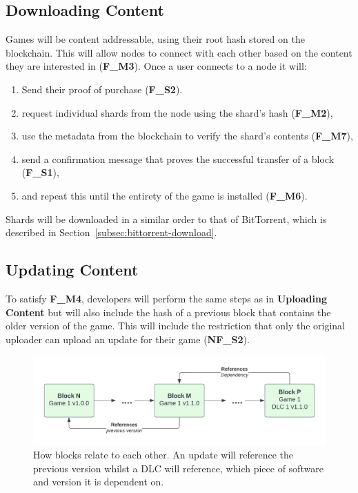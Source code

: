 \subsection*{Downloading Content}

Games will be content addressable, using their root hash stored on the blockchain. This will allow nodes to connect with each other based on the content they are interested in (\textbf{F\_M3}). Once a user connects to a node it will:

\begin{enumerate}
  \item Send their proof of purchase (\textbf{F\_S2}).
  \item request individual shards from the node using the shard's hash (\textbf{F\_M2}),
  \item use the metadata from the blockchain to verify the shard's contents (\textbf{F\_M7}),
  \item send a confirmation message that proves the successful transfer of a block (\textbf{F\_S1}), 
  \item and repeat this until the entirety of the game is installed (\textbf{F\_M6}).
\end{enumerate}

\noindent Shards will be downloaded in a similar order to that of BitTorrent, which is described in Section~\ref{subsec:bittorrent-download}.

\subsection*{Updating Content}

To satisfy \textbf{F\_M4}, developers will perform the same steps as in \textbf{Uploading Content} but will also include the hash of a previous block that contains the older version of the game. This will include the restriction that only the original uploader can upload an update for their game (\textbf{NF\_S2}).

\begin{figure}[ht]
  \centering
  \includegraphics[width=.85\textwidth]{assets/images/diagrams/software.png}
  \caption{How blocks relate to each other. An update will reference the previous version whilst a DLC will reference, which piece of software and version it is dependent on.}
\end{figure}

